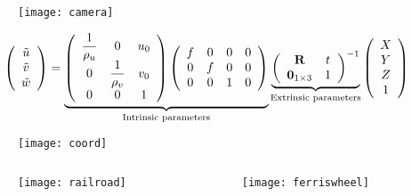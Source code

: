 \begin{frame}
\begin{figure}[!h]
\centering
\texttt{[image: camera]}
\end{figure}
\[
\left (
\begin{array}{c}
\tilde{u} \\
\tilde{v} \\
\tilde{w}
\end{array}
\right )
=
\underbrace{
\left (
\begin{array}{ccc}
\dfrac{1}{\rho_u} & 0 & u_{0} \\
0 & \dfrac{1}{\rho_v} & v_{0} \\
0 & 0 & 1
\end{array}
\right )
\left (
\begin{array}{cccc}
f & 0 & 0 & 0 \\
0 & f & 0 & 0 \\
0 & 0 & 1 & 0
\end{array}
\right )
}_{\text{Intrinsic parameters}}
\underbrace{
\left (
\begin{array}{cc}
\textbf{\text{R}} & t \\
\textbf{\text{0}}_{1\times 3} & 1
\end{array}
\right )^{-1}
}_{\text{Extrinsic parameters}}
\left (
\begin{array}{c}
X \\
Y \\
Z \\
1
\end{array}
\right )
\]
\end{frame}

\begin{frame}
\begin{figure}[h]
\texttt{[image: coord]}
\end{figure}
\end{frame}

\begin{frame}
\begin{columns}
\begin{column}{.5\textwidth}
\begin{figure}[!h]
\centering
\texttt{[image: railroad]}
\end{figure}
\end{column}
\begin{column}{.5\textwidth}
\begin{figure}[!h]
\centering
\texttt{[image: ferriswheel]}
\end{figure}
\end{column}
\end{columns}
\end{frame}

